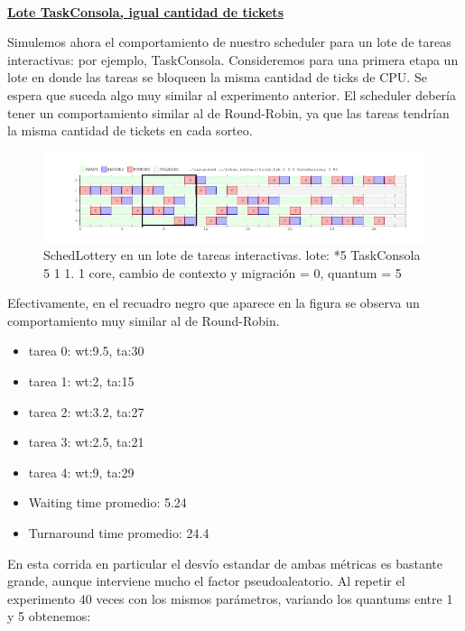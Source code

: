 ~

\textbf{\underline{Lote TaskConsola, igual cantidad de tickets}}

Simulemos ahora el comportamiento de nuestro scheduler para un lote de tareas interactivas: por ejemplo, TaskConsola.
Consideremos para una primera etapa un lote en donde las tareas se bloqueen la misma cantidad de ticks de CPU. Se espera que suceda algo muy similar
al experimento anterior. El scheduler debería tener un comportamiento similar al de Round-Robin, ya que las tareas tendrían la misma cantidad de tickets
en cada sorteo.
 
\begin{figure}[H]
  \centering\includegraphics[scale=0.5]{graficos/lottery_console.jpg}
  \caption{SchedLottery en un lote de tareas interactivas. lote: *5 TaskConsola 5 1 1.
	1 core, cambio de contexto y migración = 0, quantum = 5}
\end{figure}
 
Efectivamente, en el recuadro negro que aparece en la figura se observa un comportamiento muy similar al de Round-Robin.

\begin{itemize}
  \item tarea 0: wt:9.5, ta:30
  \item tarea 1: wt:2, ta:15
  \item tarea 2: wt:3.2, ta:27
  \item tarea 3: wt:2.5, ta:21
  \item tarea 4: wt:9, ta:29
  \item Waiting time promedio: 5.24
  \item Turnaround time promedio: 24.4
\end{itemize}

En esta corrida en particular el desvío estandar de ambas métricas es bastante grande, aunque interviene mucho el factor pseudoaleatorio.
Al repetir el experimento 40 veces con los mismos parámetros, variando los quantums entre 1 y 5 obtenemos:


